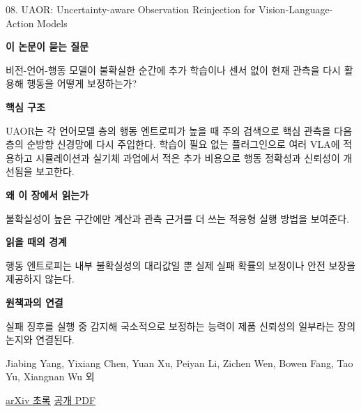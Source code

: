 \documentclass[11pt,openany]{book}
\begin{document}
\begin{termcard}{08. UAOR: Uncertainty-aware Observation Reinjection for Vision-Language-Action Models}

\par

\medskip

{\sffamily\bfseries\color{deepblue} 이 논문이 묻는 질문}\par

비전-언어-행동 모델이 불확실한 순간에 추가 학습이나 센서 없이 현재 관측을 다시 활용해 행동을 어떻게 보정하는가?

\smallskip

{\sffamily\bfseries\color{deepblue} 핵심 구조}\par

UAOR는 각 언어모델 층의 행동 엔트로피가 높을 때 주의 검색으로 핵심 관측을 다음 층의 순방향 신경망에 다시 주입한다. 학습이 필요 없는 플러그인으로 여러 VLA에 적용하고 시뮬레이션과 실기체 과업에서 적은 추가 비용으로 행동 정확성과 신뢰성이 개선됨을 보고한다.

\smallskip

{\sffamily\bfseries\color{deepblue} 왜 이 장에서 읽는가}\par

불확실성이 높은 구간에만 계산과 관측 근거를 더 쓰는 적응형 실행 방법을 보여준다.

\smallskip

{\sffamily\bfseries\color{coral} 읽을 때의 경계}\par

행동 엔트로피는 내부 불확실성의 대리값일 뿐 실제 실패 확률의 보정이나 안전 보장을 제공하지 않는다.

\smallskip

{\sffamily\bfseries\color{teal} 원책과의 연결}\par

실패 징후를 실행 중 감지해 국소적으로 보정하는 능력이 제품 신뢰성의 일부라는 장의 논지와 연결된다.

\medskip

{\footnotesize\color{muted} Jiabing Yang, Yixiang Chen, Yuan Xu, Peiyan Li, Zichen Wen, Bowen Fang, Tao Yu, Xiangnan Wu 외\par

\href{https://arxiv.org/abs/2602.18020}{arXiv 초록} \quad \href{https://arxiv.org/pdf/2602.18020}{공개 PDF}\par}

\end{termcard}
\end{document}
